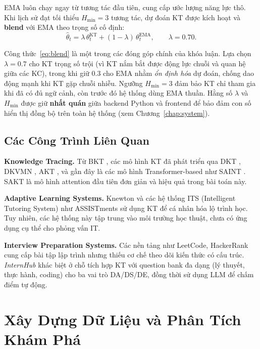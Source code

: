 \documentclass[12pt, a4paper]{report}
\newcommand{\system}{\textit{InternHub}}
\begin{document}
EMA luôn chạy ngay từ tương tác đầu tiên, cung cấp ước lượng năng lực thô. Khi lịch sử đạt tối thiểu $H_{\min} = 3$ tương tác, dự đoán KT được kích hoạt và \textbf{blend} với EMA theo trọng số cố định:
\begin{equation}
  \hat{\theta}_t = \lambda \, \theta^{\text{KT}}_t + (1 - \lambda)\,\theta^{\text{EMA}}_t,
  \qquad \lambda = 0.70 .
  \label{eq:blend}
\end{equation}

Công thức~\eqref{eq:blend} là một trong các đóng góp chính của khóa luận. Lựa chọn $\lambda = 0.7$ cho KT trọng số trội (vì KT nắm bắt được động lực chuỗi và quan hệ giữa các KC), trong khi giữ $0.3$ cho EMA nhằm \textit{ổn định hóa} dự đoán, chống dao động mạnh khi KT gặp chuỗi nhiễu. Ngưỡng $H_{\min}=3$ đảm bảo KT chỉ tham gia khi đã có đủ ngữ cảnh, còn trước đó hệ thống dùng EMA thuần. Hằng số $\lambda$ và $H_{\min}$ được giữ \textbf{nhất quán} giữa backend Python và frontend để bảo đảm con số hiển thị đồng bộ trên toàn hệ thống (xem Chương~\ref{chap:system}).

\section{Các Công Trình Liên Quan}
\label{sec:related}

\textbf{Knowledge Tracing.} Từ BKT \cite{corbett1994knowledge}, các mô hình KT đã phát triển qua DKT \cite{piech2015deep}, DKVMN \cite{zhang2017dynamic}, AKT \cite{ghosh2020context}, và gần đây là các mô hình Transformer-based như SAINT \cite{choi2020towards}. SAKT \cite{pandey2019self} là mô hình attention đầu tiên đơn giản và hiệu quả trong bài toán này.

\textbf{Adaptive Learning Systems.} Knewton \cite{ferreira2017knewton} và các hệ thống ITS (Intelligent Tutoring System) như ASSISTments \cite{heffernan2014assistments} sử dụng KT để cá nhân hóa lộ trình học. Tuy nhiên, các hệ thống này tập trung vào môi trường học thuật, chưa có ứng dụng cụ thể cho phỏng vấn IT.

\textbf{Interview Preparation Systems.} Các nền tảng như LeetCode, HackerRank cung cấp bài tập lập trình nhưng thiếu cơ chế theo dõi kiến thức có cấu trúc. \system{} khác biệt ở chỗ tích hợp KT với question bank đa dạng (lý thuyết, thực hành, coding) cho ba vai trò DA/DS/DE, đồng thời sử dụng LLM để chấm điểm tự động.

\chapter{Xây Dựng Dữ Liệu và Phân Tích Khám Phá}
\label{chap:data}
\end{document}
